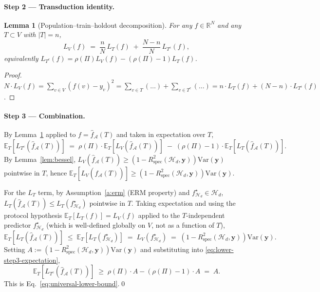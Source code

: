 \documentclass[11pt,a4paper]{article}
\theoremstyle{plain}
\newtheorem{lemma}[theorem]{Lemma}
\theoremstyle{definition}
\theoremstyle{remark}
\newcommand{\by}{\mathbf{y}}
\newcommand{\E}{\mathbb{E}}
\newcommand{\R}{\mathbb{R}}
\newcommand{\Var}{\mathrm{Var}}
\newcommand{\Rspec}{R^2_{\mathrm{spec}}}
\newcommand{\Acal}{\mathcal{A}}
\newcommand{\Hcal}{\mathcal{H}}
\begin{document}
\paragraph{Step 2 — Transduction identity.}

\begin{lemma}[Population--train--holdout decomposition]
\label{lem:transduction}
For any $f \in \R^N$ and any $T \subset V$ with $|T| = n$,
\begin{equation}
    L_V(f) \;=\; \frac{n}{N}\, L_T(f) \;+\; \frac{N-n}{N}\, L_{T^c}(f),
    \label{eq:transduction-identity}
\end{equation}
equivalently $L_{T^c}(f) = \rho(\Pi) L_V(f) - (\rho(\Pi) - 1) L_T(f)$.
\end{lemma}

\begin{proof}
$N \cdot L_V(f) = \sum_{v \in V}(f(v) - y_v)^2 = \sum_{v \in T}(\ldots)
+ \sum_{v \in T^c}(\ldots) = n \cdot L_T(f) + (N-n) \cdot L_{T^c}(f)$.
\end{proof}

\paragraph{Step 3 — Combination.}

By Lemma~\ref{lem:transduction} applied to $f = \hat f_\Acal(T)$ and
taken in expectation over $T$,
\begin{equation}
    \E_T[L_{T^c}(\hat f_\Acal(T))]
    \;=\; \rho(\Pi) \cdot \E_T[L_V(\hat f_\Acal(T))]
        \;-\; (\rho(\Pi) - 1) \cdot \E_T[L_T(\hat f_\Acal(T))].
    \label{eq:lower-step3-expectation}
\end{equation}
By Lemma~\ref{lem:bessel}, $L_V(\hat f_\Acal(T)) \geq (1 -
\Rspec(\Hcal_d, \by))\Var(\by)$ pointwise in $T$, hence
$\E_T[L_V(\hat f_\Acal(T))] \geq (1 - \Rspec(\Hcal_d, \by))\Var(\by)$.

For the $L_T$ term, by Assumption~\ref{a:erm} (ERM property) and
$f^\star_{\Hcal_d} \in \Hcal_d$,
$L_T(\hat f_\Acal(T)) \leq L_T(f^\star_{\Hcal_d})$ pointwise in $T$.
Taking expectation and using the protocol hypothesis $\E_T[L_T(f)]
= L_V(f)$ applied to the $T$-independent predictor $f^\star_{\Hcal_d}$
(which is well-defined globally on $V$, not as a function of $T$),
\begin{equation}
    \E_T[L_T(\hat f_\Acal(T))]
    \;\leq\; \E_T[L_T(f^\star_{\Hcal_d})]
    \;=\; L_V(f^\star_{\Hcal_d})
    \;=\; (1 - \Rspec(\Hcal_d, \by)) \Var(\by).
    \label{eq:lower-step3-LT}
\end{equation}
Setting $A := (1 - \Rspec(\Hcal_d, \by)) \Var(\by)$ and substituting
into \eqref{eq:lower-step3-expectation},
$$
\E_T[L_{T^c}(\hat f_\Acal(T))] \;\geq\; \rho(\Pi) \cdot A - (\rho(\Pi) - 1) \cdot A \;=\; A.
$$
This is Eq.~\eqref{eq:universal-lower-bound}.\qed
\end{document}

